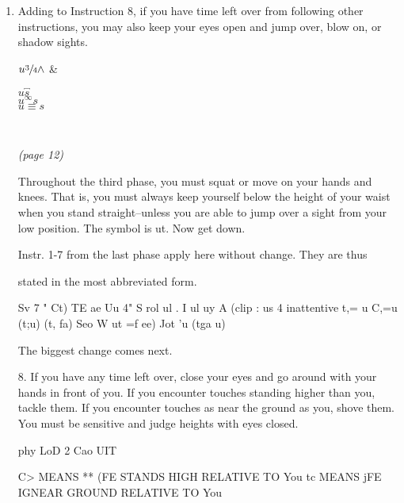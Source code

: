\documentclass[10pt,twoside]{memoir}
\begin{document}
\begin{enumerate}
{\begin{enumerate}
\begin{sysrules}
\begin{sysrules}
\begin{sysrules}
\begin{sysrules}
{\begin{enumerate}
\begin{sysrules}
\begin{enumerate}
So far there have been only three changes in the instructions. Memorize 
them. Then go on to Instr. 12, which is new, and carry it out along with the 
other eleven instructions. 

\textsc{As soon as you have put any changed instruction (3, 9, or 11) into practice,
the second phase is over. Turn to page 12 and the third phase.}


If you can't practice the instructions because all the components have 
vanished, skip to Page 18. 


\item Adding to Instruction 8, if you have time left over from following 
other instructions, you may also keep your eyes open and jump over, blow 
on, or shadow sights. 

\begin{tabular}
	$u\sfrac{3}{4}\wedge$ & \begin{tabular}
		$u\overbracket{s}$ \\ \midrule
		$u^\infty s$ \\ \midrule
		$u\equiv s$ \\
	\end{tabular} \\
\end{tabular}

\emph{(page 12)}

Throughout the third phase, you must squat or move on your hands 
and knees. That is, you must always keep yourself below the height of your 
waist when you stand straight--unless you are able to jump over a sight from 
your low position. The symbol is ut. Now get down. 

Instr. 1-7 from the last phase apply here without change. They are thus 


stated in the most abbreviated form. 


Sv 7 
" Ct) TE ae 
Uu 4" S rol ul . I ul uy A 
(clip : us 4 inattentive 
t,= u C,=u 
(t;u) (t, fa) 
Seo W ut =f 
ee) 
Jot 'u 
(tga u) 


The biggest change comes next. 

8. If you have any time left over, close your eyes and go around with 
your hands in front of you. If you encounter touches standing higher than 
you, tackle them. If you encounter touches as near the ground as you, shove 
them. You must be sensitive and judge heights with eyes closed. 


phy LoD 
2 Cao UIT 


C> MEANS ** (FE STANDS HIGH RELATIVE TO You 
tc MEANS jFE IGNEAR GROUND RELATIVE TO You 



\end{enumerate}
\end{sysrules}
\end{enumerate}}
\end{sysrules}
\end{sysrules}
\end{sysrules}
\end{sysrules}
\end{enumerate}}
\end{enumerate}
\end{document}
